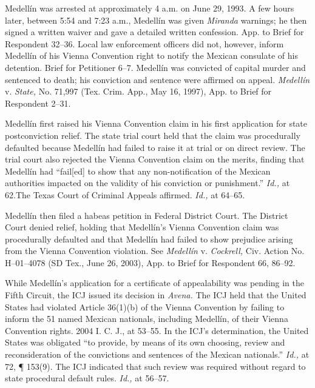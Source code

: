 {{  Medellín was arrested at approximately 4 a.m. on June 29, 1993.
A few hours later, between 5:54 and 7:23 a.m., Medellín was given
\emph{Miranda} warnings; he then signed a written waiver and gave a
detailed written confession. App. to Brief for Respondent 32--36.
Local law enforcement officers did not, however, inform Medellín of
his Vienna Convention right to notify the Mexican consulate of his
detention. Brief for Petitioner 6--7. Medellín was convicted of
capital murder and sentenced to death; his conviction and sentence were
affirmed on appeal. \emph{Medellín} v. \emph{State,} No. 71,997 (Tex. Crim.
App., May 16, 1997), App. to Brief for Respondent 2--31.

  Medellín first raised his Vienna Convention claim in his first
application for state postconviction relief. The state trial court held
that the claim was procedurally defaulted because Medellín had failed
to raise it at trial or on direct review. The trial court also rejected
the Vienna Convention claim on the merits, finding that Medellín had
``fail[ed] to show that any non-notification of the Mexican authorities
im\newpage pacted on the validity of his conviction or punishment.''
\emph{Id.,} at 62.\footnotemark[1] The Texas Court of Criminal Appeals affirmed.
\emph{Id.,} at 64--65.

  Medellín then filed a habeas petition in Federal District Court.
The District Court denied relief, holding that Medellín's Vienna
Convention claim was procedurally defaulted and that Medellín had
failed to show prejudice arising from the Vienna Convention violation.
See \emph{Medellín} v. \emph{Cockrell,} Civ. Action No. H--01--4078 (SD
Tex., June 26, 2003), App. to Brief for Respondent 66, 86--92.

  While Medellín's application for a certificate of appealability was
pending in the Fifth Circuit, the ICJ issued its decision in \emph{Avena.}
The ICJ held that the United States had violated Article 36(1)(b) of the
Vienna Convention by failing to inform the 51 named Mexican nationals,
including Medellín, of their Vienna Convention rights. 2004 I. C.
J., at 53--55. In the ICJ's determination, the United States
was obligated ``to provide, by means of its own choosing, review
and reconsideration of the convictions and sentences of the \newpage 
[affected] Mexican nationals.'' \emph{Id.,} at 72, ¶ 153(9). The
ICJ indicated that such review was required without regard to state
procedural default rules. \emph{Id.,} at 56--57.


}}

